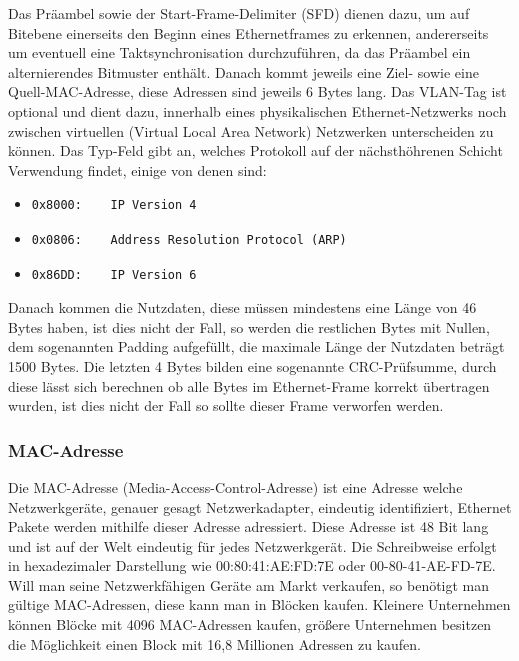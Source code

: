 \documentclass[a4paper,14pt,headsepline]{scrartcl}
\begin{document}
Das Präambel sowie der Start-Frame-Delimiter (SFD) dienen dazu, um auf Bitebene einerseits den Beginn eines Ethernetframes zu erkennen, andererseits um eventuell eine Taktsynchronisation durchzuführen, da das Präambel ein alternierendes Bitmuster enthält. Danach kommt jeweils eine Ziel- sowie eine Quell-MAC-Adresse, diese Adressen sind jeweils 6 Bytes lang. Das VLAN-Tag ist optional und dient dazu, innerhalb eines physikalischen Ethernet-Netzwerks noch zwischen virtuellen (Virtual Local Area Network) Netzwerken unterscheiden zu können. Das Typ-Feld gibt an, welches Protokoll auf der nächsthöhrenen Schicht Verwendung findet, einige von denen sind:
\begin{itemize}
	\item \begin{verbatim}0x8000:    IP Version 4 \end{verbatim}
	\item \begin{verbatim}0x0806:    Address Resolution Protocol (ARP) \end{verbatim}
	\item \begin{verbatim}0x86DD:    IP Version 6 \end{verbatim}
\end{itemize}
Danach kommen die Nutzdaten, diese müssen mindestens eine Länge von 46 Bytes haben, ist dies nicht der Fall, so werden die restlichen Bytes mit Nullen, dem sogenannten Padding aufgefüllt, die maximale Länge der Nutzdaten beträgt 1500 Bytes. Die letzten 4 Bytes bilden eine sogenannte CRC-Prüfsumme, durch diese lässt sich berechnen ob alle Bytes im Ethernet-Frame korrekt übertragen wurden, ist dies nicht der Fall so sollte dieser Frame verworfen werden.

\subsubsection{MAC-Adresse}
Die MAC-Adresse (Media-Access-Control-Adresse) ist eine Adresse welche Netzwerkgeräte, genauer gesagt Netzwerkadapter, eindeutig identifiziert, Ethernet Pakete werden mithilfe dieser Adresse adressiert. Diese Adresse ist 48 Bit lang und ist auf der Welt eindeutig für jedes Netzwerkgerät. Die Schreibweise erfolgt in hexadezimaler Darstellung wie 00:80:41:AE:FD:7E oder 00-80-41-AE-FD-7E. Will man seine Netzwerkfähigen Geräte am Markt verkaufen, so benötigt man gültige MAC-Adressen, diese kann man in Blöcken kaufen. Kleinere Unternehmen können Blöcke mit 4096 MAC-Adressen kaufen, größere Unternehmen besitzen die Möglichkeit einen Block mit 16,8 Millionen Adressen zu kaufen.
\end{document}
